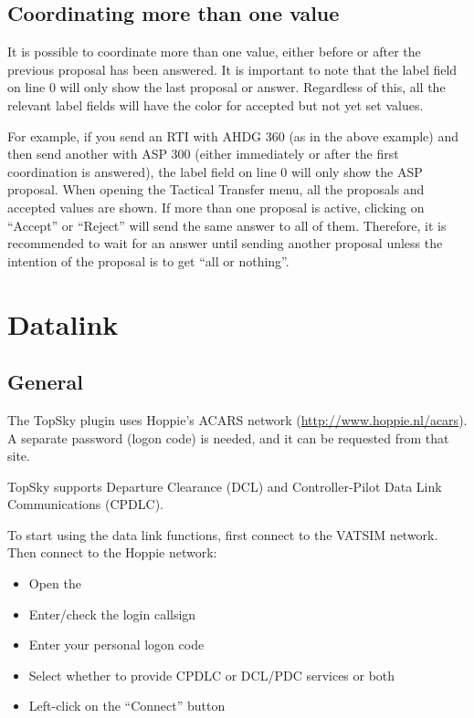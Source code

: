 \documentclass[11pt,a4paper]{memoir}
\newcommand{\colorref}[1]{\textit{\hyperref[#1]{\StrDel{#1}{color:}}}}
\begin{document}
\section{Coordinating more than one value}

It is possible to coordinate more than one value, either before or after the previous proposal has been answered. It is important to note that the label field on line 0 will only show the last proposal or answer. Regardless of this, all the relevant label fields will have the \colorref{color:Information} color for accepted but not yet set values.

For example, if you send an RTI with AHDG 360 (as in the above example) and then send another with ASP 300 (either immediately or after the first coordination is answered), the label field on line 0 will only show the ASP proposal. When opening the Tactical Transfer menu, all the proposals and accepted values are shown. If more than one proposal is active, clicking on “Accept” or “Reject” will send the same answer to all of them. Therefore, it is recommended to wait for an answer until sending another proposal unless the intention of the proposal is to get “all or nothing”.

\chapter{Datalink}

\section{General}

The TopSky plugin uses Hoppie’s ACARS network (\url{http://www.hoppie.nl/acars}). A separate password (logon code) is needed, and it can be requested from that site. 

TopSky supports Departure Clearance (DCL) and Controller-Pilot Data Link Communications (CPDLC).

To start using the data link functions, first connect to the VATSIM network. Then connect to the Hoppie network:

\begin{itemize}
  \item Open the \textit{}
  \item Enter/check the login callsign
  \item Enter your personal logon code
  \item Select whether to provide CPDLC or DCL/PDC services or both
  \item Left-click on the “Connect” button
\end{itemize}
\end{document}
